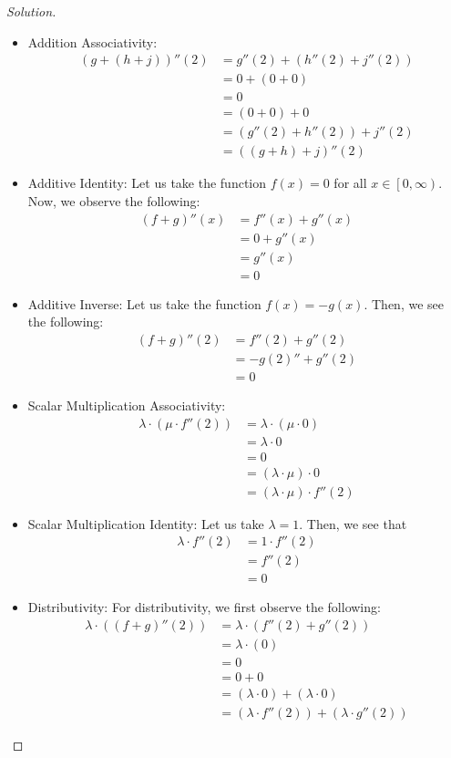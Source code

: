 \documentclass{article}
\newenvironment{solution}{\begin{proof}[Solution]}{\end{proof}}
\begin{document}
\begin{solution}
\begin{itemize}
		\item Addition Associativity:
		\begin{align*}
			(g + (h + j))''(2) &= g''(2) + (h''(2) + j''(2)) \\
			&= 0 + (0 + 0) \\
			&= 0 \\
			&= (0 + 0) + 0 \\
			&= (g''(2) + h''(2)) + j''(2) \\
			&= ( (g+h) + j)''(2)
		\end{align*}
	
		\item Additive Identity: Let us take the function $f(x) = 0$ for all $x \in \left[ 0, \infty \right)$. Now, we observe the following:
		\begin{align*}
			(f + g)''(x) &= f''(x) + g''(x) \\
			&= 0 + g''(x) \\
			&= g''(x) \\
			&= 0
		\end{align*}
	
		\item Additive Inverse: Let us take the function $f(x) = -g(x)$. Then, we see the following:
		\begin{align*}
			(f+g)''(2) &= f''(2) + g''(2) \\
			&= -g(2)'' + g''(2) \\
			&= 0
		\end{align*}
	
		\item Scalar Multiplication Associativity:
		\begin{align*}
			\lambda \cdot (\mu \cdot f''(2)) &= \lambda \cdot (\mu \cdot 0) \\
			&= \lambda \cdot 0 \\
			&= 0 \\
			&= (\lambda \cdot \mu) \cdot 0 \\
			&= (\lambda \cdot \mu) \cdot f''(2)
		\end{align*}
	
		\item Scalar Multiplication Identity: Let us take $\lambda = 1$. Then, we see that
		\begin{align*}
			\lambda \cdot f''(2) &= 1 \cdot f''(2) \\
			&= f''(2) \\
			&= 0
		\end{align*}
		
		\item Distributivity: For distributivity, we first observe the following:
		\begin{align*}
			\lambda \cdot ( (f+g)''(2)) &= \lambda \cdot (f''(2) + g''(2)) \\
			&= \lambda \cdot (0) \\
			&= 0 \\
			&= 0 + 0 \\
			&= (\lambda \cdot 0) + (\lambda \cdot 0) \\
			&= (\lambda \cdot f''(2)) + (\lambda \cdot g''(2))
		\end{align*}
	

\end{itemize}
\end{solution}
\end{document}
